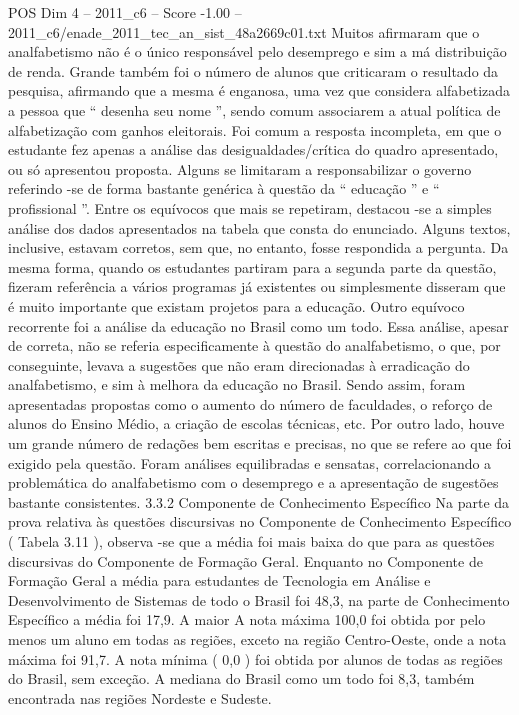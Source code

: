 \begin{textsample}{POS Dim 4 – 2011\_c6 – Score -1.00 – 2011\_c6/enade\_2011\_tec\_an\_sist\_48a2669c01.txt}
Muitos afirmaram que o analfabetismo não é o único responsável pelo desemprego e sim a má distribuição de renda.
Grande também foi o número de alunos que criticaram o resultado da pesquisa, afirmando que a mesma é enganosa, uma vez que considera alfabetizada a pessoa que “ desenha seu nome ”, sendo comum associarem a atual política de alfabetização com ganhos eleitorais.
Foi comum a resposta incompleta, em que o estudante fez apenas a análise das desigualdades/crítica do quadro apresentado, ou só apresentou proposta.
Alguns se limitaram a responsabilizar o governo referindo -se de forma bastante genérica à questão da “ educação ” e “ profissional ”.
Entre os equívocos que mais se repetiram, destacou -se a simples análise dos dados apresentados na tabela que consta do enunciado.
Alguns textos, inclusive, estavam corretos, sem que, no entanto, fosse respondida a pergunta.
Da mesma forma, quando os estudantes partiram para a segunda parte da questão, fizeram referência a vários programas já existentes ou simplesmente disseram que é muito importante que existam projetos para a educação.
Outro equívoco recorrente foi a análise da educação no Brasil como um todo.
Essa análise, apesar de correta, não se referia especificamente à questão do analfabetismo, o que, por conseguinte, levava a sugestões que não eram direcionadas à erradicação do analfabetismo, e sim à melhora da educação no Brasil.
Sendo assim, foram apresentadas propostas como o aumento do número de faculdades, o reforço de alunos do Ensino Médio, a criação de escolas técnicas, etc.
Por outro lado, houve um grande número de redações bem escritas e precisas, no que se refere ao que foi exigido pela questão.
Foram análises equilibradas e sensatas, correlacionando a problemática do analfabetismo com o desemprego e a apresentação de sugestões bastante consistentes. 3.3.2 Componente de Conhecimento Específico Na parte da prova relativa às questões discursivas no Componente de Conhecimento Específico ( Tabela 3.11 ), observa -se que a média foi mais baixa do que para as questões discursivas do Componente de Formação Geral.
Enquanto no Componente de Formação Geral a média para estudantes de Tecnologia em Análise e Desenvolvimento de Sistemas de todo o Brasil foi 48,3, na parte de Conhecimento Específico a média foi 17,9.
A maior A nota máxima 100,0 foi obtida por pelo menos um aluno em todas as regiões, exceto na região Centro-Oeste, onde a nota máxima foi 91,7.
A nota mínima ( 0,0 ) foi obtida por alunos de todas as regiões do Brasil, sem exceção.
A mediana do Brasil como um todo foi 8,3, também encontrada nas regiões Nordeste e Sudeste.

\end{textsample}
